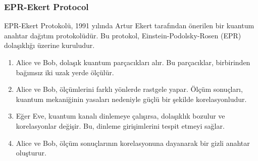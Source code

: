 \subsubsection{EPR-Ekert Protocol}

EPR-Ekert Protokolü, 1991 yılında Artur Ekert tarafından önerilen bir kuantum anahtar dağıtım protokolüdür. Bu protokol, Einstein-Podolsky-Rosen (EPR) dolaşıklığı üzerine kuruludur. 

\begin{enumerate}
    \item Alice ve Bob, dolaşık kuantum parçacıkları alır. Bu parçacıklar, birbirinden bağımsız iki uzak yerde ölçülür.
    \item Alice ve Bob, ölçümlerini farklı yönlerde rastgele yapar. Ölçüm sonuçları, kuantum mekaniğinin yasaları nedeniyle güçlü bir şekilde korelasyonludur.
    \item Eğer Eve, kuantum kanalı dinlemeye çalışırsa, dolaşıklık bozulur ve korelasyonlar değişir. Bu, dinleme girişimlerini tespit etmeyi sağlar.
    \item Alice ve Bob, ölçüm sonuçlarının korelasyonuna dayanarak bir gizli anahtar oluşturur.
\end{enumerate}

\newpage